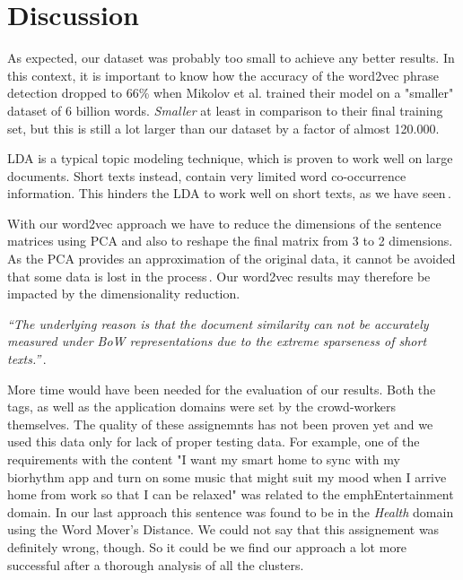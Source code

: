 \section{Discussion}
\label{sec:discussion}
As expected, our dataset was probably too small to achieve any better results. In this context, it is important to know how the accuracy of the word2vec phrase detection dropped to 66\% when Mikolov et al. trained their model on a "smaller" dataset of 6 billion words\cite[p7]{mikolov_distributed_2013}. \emph{Smaller} at least in comparison to their final training set, but this is still a lot larger than our dataset by a factor of almost 120.000.

LDA is a typical topic modeling technique, which is proven to work well on large documents. Short texts instead, contain very limited word co-occurrence information. This hinders the LDA to work well on short texts, as we have seen\,\cite{quan_short_2015}.

With our word2vec approach we have to reduce the dimensions of the sentence matrices using PCA and also to reshape the final matrix from 3 to 2 dimensions. As the PCA provides an approximation of the original data, it cannot be avoided that some data is lost in the process\,\cite{wold_principal_1987}. Our word2vec results may therefore be impacted by the dimensionality reduction.

\textit{``The underlying reason is that the document similarity can not be accurately measured under BoW representations due to the extreme sparseness of short texts.''}\,\cite{li_classifying_2019}.

More time would have been needed for the evaluation of our results. Both the tags, as well as the application domains were set by the crowd-workers themselves. The quality of these assignemnts has not been proven yet and we used this data only for lack of proper testing data. For example, one of the requirements with the content "I want my smart home to sync with my biorhythm app and turn on some music that might suit my mood when I arrive home from work so that I can be relaxed" was related to the emph{Entertainment} domain. In our last approach this sentence was found to be in the \emph{Health} domain using the Word Mover's Distance. We could not say that this assignement was definitely wrong, though. So it could be we find our approach a lot more successful after a thorough analysis of all the clusters.

